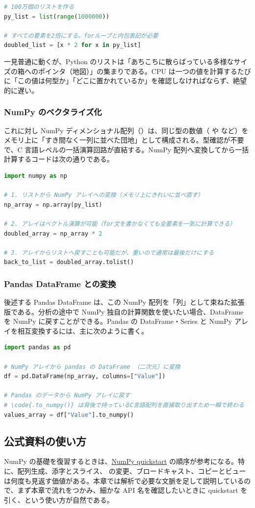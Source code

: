 \begin{lstlisting}[language=Python]
# 100万個のリストを作る
py_list = list(range(1000000))

# すべての要素を2倍にする。forループと内包表記が必要
doubled_list = [x * 2 for x in py_list]
\end{lstlisting}

一見普通に動くが、Python のリストは「あちこちに散らばっている多様なサイズの箱へのポインタ（地図）」の集まりである。CPU は一つの値を計算するたびに「この値は何型か」「どこに置かれているか」を確認しなければならず、絶望的に遅い。

\subsubsection{NumPy のベクタライズ化}

これに対し NumPy ディメンショナル配列（）は、同じ型の数値（ や  など）をメモリ上に「すき間なく一列に並べた団地」として構成される。型確認が不要で、C 言語レベルの一括演算回路が直結する。NumPy 配列へ変換してから一括計算するコードは次の通りである。

\begin{lstlisting}[language=Python]
import numpy as np

# 1. リストから NumPy アレイへの変換（メモリ上にきれいに並べ直す）
np_array = np.array(py_list)

# 2. アレイはベクトル演算が可能（for文を書かなくても全要素を一気に計算できる）
doubled_array = np_array * 2

# 3. アレイからリストへ戻すことも可能だが、重いので通常は最後だけにする
back_to_list = doubled_array.tolist()
\end{lstlisting}

\subsubsection{Pandas DataFrame との変換}

後述する Pandas DataFrame は、この NumPy 配列を「列」として束ねた拡張版である。分析の途中で NumPy 独自の計算関数を使いたい場合、DataFrame を NumPy に戻すことができる。Pandas の DataFrame・Series と NumPy アレイを相互変換するには、主に次のように書く。

\begin{lstlisting}[language=Python]
import pandas as pd

# NumPy アレイから pandas の DataFrame （二次元）に変換
df = pd.DataFrame(np_array, columns=["Value"])

# Pandas のデータから NumPy アレイに戻す
# \code{.to_numpy()} は背後で持っているC言語配列を直接取り出すため一瞬で終わる
values_array = df["Value"].to_numpy()
\end{lstlisting}

\subsection{公式資料の使い方}

NumPy の基礎を復習するときは、\href{https://numpy.org/devdocs/user/quickstart.html}{NumPy quickstart} の順序が参考になる。特に、配列生成、添字とスライス、 の変更、ブロードキャスト、コピーとビューは何度も見返す価値がある。本章では解析で必要な文脈を足して説明しているので、まず本章で流れをつかみ、細かな API 名を確認したいときに quickstart を引く、という使い方が自然である。
